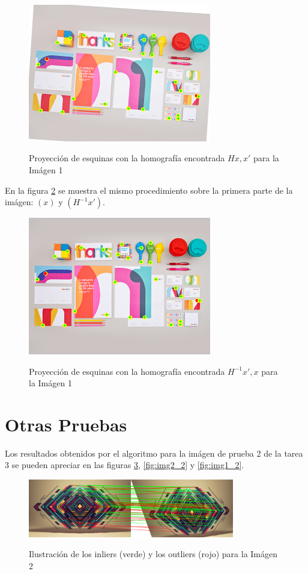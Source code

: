 \documentclass{IEEEtran}
\begin{document}
\begin{figure}[H]
\caption{Proyección de esquinas con la homografía encontrada $Hx, x'$ para la Imágen 1}
\centering
\includegraphics[width=8cm,natwidth=600,natheight=450]{figs/img2_1.png}
\label{fig:img2_1}
\end{figure}

En la figura \ref{fig:img1_1} se muestra el mismo procedimiento sobre
la primera parte de la imágen: $(x)$ y $(H^{-1}x')$.

\begin{figure}[H]
\caption{Proyección de esquinas con la homografía encontrada $H^{-1}x', x$ para la Imágen 1}
\centering
\includegraphics[width=8cm,natwidth=600,natheight=450]{figs/img1_1.png}
\label{fig:img1_1}
\end{figure}

\section{Otras Pruebas}

Los resultados obtenidos por el algoritmo para la imágen de prueba 2
de la tarea 3 se pueden apreciar en las figuras \ref{fig:bigimg_2}, 
\ref{fig:img2_2} y \ref{fig:img1_2}.

\begin{figure}[H]
\caption{Ilustración de los inliers (verde) y los outliers (rojo) para la Imágen 2}
\centering
\includegraphics[width=9cm,natwidth=1200,natheight=450]{figs/bigimg_2.png}
\label{fig:bigimg_2}
\end{figure}
\end{document}
